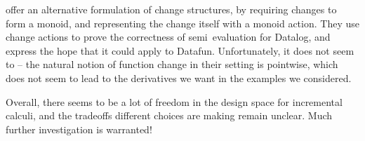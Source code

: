 \citet{DBLP:conf/esop/Alvarez-Picallo19} offer an alternative
formulation of change structures, by requiring changes to form a
monoid, and representing the change itself with a monoid action. They
use change actions to prove the correctness of semi\naive\ evaluation
for Datalog, and express the hope that it could apply to Datafun.
Unfortunately, it does not seem to -- the natural notion of function
change in their setting is pointwise, which does not seem to lead to
the derivatives we want in the examples we considered.

Overall, there seems to be a lot of freedom in the design space for
incremental calculi, and the tradeoffs different choices are making
remain unclear. Much further investigation is warranted!






